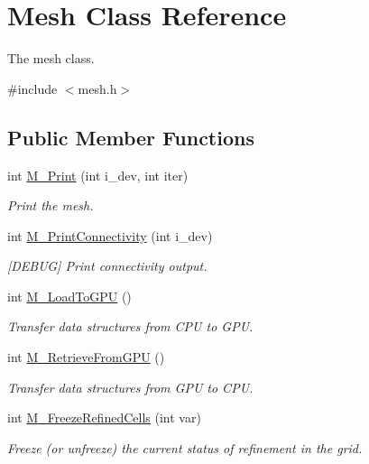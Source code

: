 \hypertarget{classMesh}{}\section{Mesh Class Reference}
\label{classMesh}


The mesh class.  




{\ttfamily \#include $<$mesh.\+h$>$}

\subsection*{Public Member Functions}
\begin{DoxyCompactItemize}
\item 
int \hyperlink{classMesh_a054ca03cc4a2c7d2fd01db790855a066}{M\+\_\+\+Print} (int i\+\_\+dev, int iter)
\begin{DoxyCompactList}\small\item\em Print the mesh. \end{DoxyCompactList}\item 
int \hyperlink{classMesh_a4d6deb8379e8f8573d17915a14eede30}{M\+\_\+\+Print\+Connectivity} (int i\+\_\+dev)
\begin{DoxyCompactList}\small\item\em \mbox{[}D\+E\+B\+UG\mbox{]} Print connectivity output. \end{DoxyCompactList}\item 
int \hyperlink{classMesh_a18eb5172a0fc6167fe37c357ad3ef345}{M\+\_\+\+Load\+To\+G\+PU} ()
\begin{DoxyCompactList}\small\item\em Transfer data structures from C\+PU to G\+PU. \end{DoxyCompactList}\item 
int \hyperlink{classMesh_a19de000974249ca4f03b00e1cf2a8f5d}{M\+\_\+\+Retrieve\+From\+G\+PU} ()
\begin{DoxyCompactList}\small\item\em Transfer data structures from G\+PU to C\+PU. \end{DoxyCompactList}\item 
int \hyperlink{classMesh_a6350653aaf7e0115ebc8e47f97bde421}{M\+\_\+\+Freeze\+Refined\+Cells} (int var)
\begin{DoxyCompactList}\small\item\em Freeze (or unfreeze) the current status of refinement in the grid. \end{DoxyCompactList}\item 

\end{DoxyCompactItemize}
